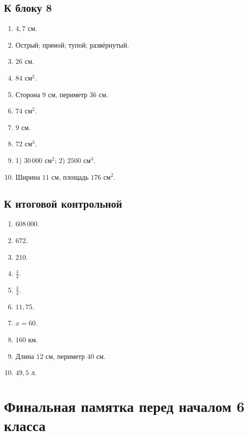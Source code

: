 \documentclass[12pt,a4paper]{article}
\begin{document}
\subsection*{К блоку 8}
\begin{enumerate}
  \item $4{,}7$ см.
  \item Острый; прямой; тупой; развёрнутый.
  \item $26$ см.
  \item $84$ см$^2$.
  \item Сторона $9$ см, периметр $36$ см.
  \item $74$ см$^2$.
  \item $9$ см.
  \item $72$ см$^3$.
  \item 1) $30\,000$ см$^2$; 2) $2500$ см$^3$.
  \item Ширина $11$ см, площадь $176$ см$^2$.
\end{enumerate}

\subsection*{К итоговой контрольной}
\begin{enumerate}
  \item $608\,000$.
  \item $672$.
  \item $210$.
  \item $\frac34$.
  \item $\frac34$.
  \item $11{,}75$.
  \item $x=60$.
  \item $160$ км.
  \item Длина $12$ см, периметр $40$ см.
  \item $49{,}5$ л.
\end{enumerate}

\section*{Финальная памятка перед началом 6 класса}
\end{document}
